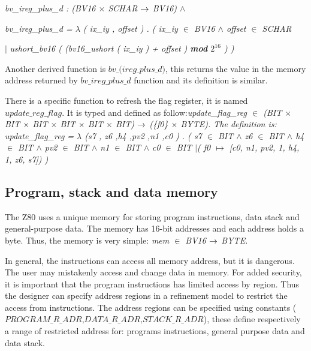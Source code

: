 \documentclass[a4paper]{llncs}
\begin{document}
\hspace*{0.0in}\it bv\_ireg\_plus\_d \rm : \rm(\it BV16  $\times$  \it SCHAR  $\rightarrow$  \it BV16\rm )  $\land$ 

\hspace*{0.0in}\it bv\_ireg\_plus\_d \rm =  $\lambda$  \rm ( \it ix\_iy \rm , \it offset \rm ) \rm . \rm ( \it ix\_iy  $\in$  \it BV16  $\land$  \it offset  $\in$  \it SCHAR   

\hspace*{0.20in}$\mid$ \it ushort\_bv16 \rm ( \rm (\it bv16\_ushort \rm ( \it ix\_iy \rm ) \rm + \it offset \rm ) 
\textbf{\textit{mod}} $2^{16}$ ) \rm )

Another derived function is  $\textit{bv\_(ireg\_plus\_d)}$, this returns the value in the memory  address
returned by $\textit{bv\_ireg\_plus\_d}$ function and its definition is similar.

There is a specific function to refresh the flag register, it is named $\textit{update\_reg\_flag}$. It is typed and defined as follow:\it update\_flag\_reg \rm $\in$ \rm (\it BIT  $\times$  \it BIT  $\times$  \it BIT  $\times$  \it
BIT $\times$  \it BIT  $\times$  \it BIT\rm) $\rightarrow$  \rm (\rm \{\it f0\rm \}  $\times$  \it BYTE\rm ).  The definition is: \it update\_flag\_reg \rm =  $\lambda$  \rm (\it s7 \rm, \it z6 \rm,\it h4 \rm,\it pv2 \rm ,\it n1
\rm ,\it c0 \rm) . 
\rm ( \it s7 $\in$ \it BIT $\land$ \it z6 $\in$ \it BIT $\land$ \it h4 $\in$ \it BIT $\land$ \it pv2 $\in$ \it BIT $\land$ \it n1 $\in$ \it BIT $\land$ \it c0 $\in$ \it BIT \rm $\mid$( \it f0  $\mapsto$ \rm [\it c0\rm , \it n1\rm , \it pv2\rm , \rm 1\rm , \it h4\rm , \rm 1\rm , \it z6\rm , \it s7\rm \rm ]\rm ) \rm )


\subsection{Program, stack and data memory}

The Z80 uses a unique memory for storing program instructions, data stack and
general-purpose data. The memory has 16-bit addresses and each address holds a byte.
Thus, the memory is very simple: \it mem  $\in$  \it BV16  $\rightarrow$  \it BYTE\rm.
 
In general, the instructions can access all memory address, but it is dangerous. The user may mistakenly
access and change data in memory. For added  security, it is important that the program instructions has
limited access by region. Thus the designer can specify address regions in a refinement model to restrict the access from
instructions. The address regions can be specified using constants
($\textit{PROGRAM\_R\_ADR,DATA\_R\_ADR,STACK\_R\_ADR}$), these define respectively a range of restricted
address for: programs instructions, general purpose data and data stack.
%
\end{document}
